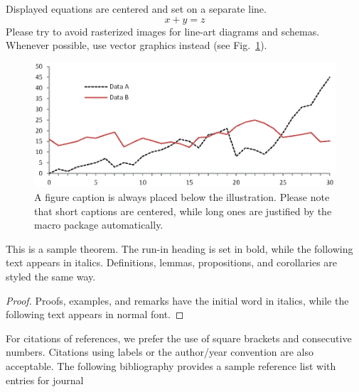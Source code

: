 \documentclass{llncs}
\begin{document}
\noindent Displayed equations are centered and set on a separate
line.
\begin{equation}
x + y = z
\end{equation}
Please try to avoid rasterized images for line-art diagrams and
schemas. Whenever possible, use vector graphics instead (see
Fig.~\ref{fig1}).

\begin{figure}
\includegraphics[width=\textwidth]{fig1.eps}
\caption{A figure caption is always placed below the illustration.
Please note that short captions are centered, while long ones are
justified by the macro package automatically.} \label{fig1}
\end{figure}

\begin{theorem}
This is a sample theorem. The run-in heading is set in bold, while
the following text appears in italics. Definitions, lemmas,
propositions, and corollaries are styled the same way.
\end{theorem}
%
%
\begin{proof}
Proofs, examples, and remarks have the initial word in italics,
while the following text appears in normal font.
\end{proof}
For citations of references, we prefer the use of square brackets
and consecutive numbers. Citations using labels or the author/year
convention are also acceptable. The following bibliography provides
a sample reference list with entries for journal




\end{document}
